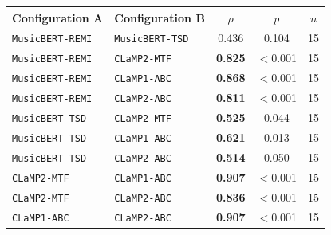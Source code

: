 \begin{tabular}{@{}llccc@{}}
\toprule
Configuration A & Configuration B & $\rho$ & $p$ & $n$ \\
\midrule
\texttt{MusicBERT-REMI} & \texttt{MusicBERT-TSD} & 0.436 & 0.104 & 15 \\
\texttt{MusicBERT-REMI} & \texttt{CLaMP2-MTF} & \textbf{0.825} & $<$0.001 & 15 \\
\texttt{MusicBERT-REMI} & \texttt{CLaMP1-ABC} & \textbf{0.868} & $<$0.001 & 15 \\
\texttt{MusicBERT-REMI} & \texttt{CLaMP2-ABC} & \textbf{0.811} & $<$0.001 & 15 \\
\texttt{MusicBERT-TSD} & \texttt{CLaMP2-MTF} & \textbf{0.525} & 0.044 & 15 \\
\texttt{MusicBERT-TSD} & \texttt{CLaMP1-ABC} & \textbf{0.621} & 0.013 & 15 \\
\texttt{MusicBERT-TSD} & \texttt{CLaMP2-ABC} & \textbf{0.514} & 0.050 & 15 \\
\texttt{CLaMP2-MTF} & \texttt{CLaMP1-ABC} & \textbf{0.907} & $<$0.001 & 15 \\
\texttt{CLaMP2-MTF} & \texttt{CLaMP2-ABC} & \textbf{0.836} & $<$0.001 & 15 \\
\texttt{CLaMP1-ABC} & \texttt{CLaMP2-ABC} & \textbf{0.907} & $<$0.001 & 15 \\
\bottomrule
\end{tabular}